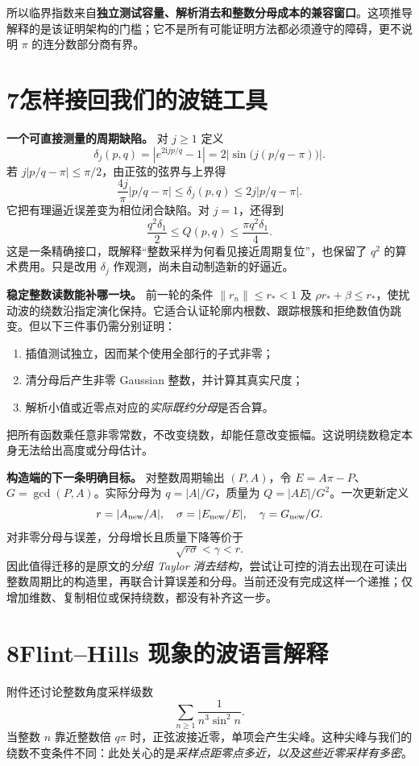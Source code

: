 \documentclass[11pt,a4paper]{article}
\newcommand{\ii}{\mathrm i}
\begin{document}
所以临界指数来自\textbf{独立测试容量、解析消去和整数分母成本的兼容窗口}。这项推导解释的是该证明架构的门槛；它不是所有可能证明方法都必须遵守的障碍，更不说明 $\pi$ 的连分数部分商有界。

\newpage
\section*{7\quad 怎样接回我们的波链工具}
\textbf{一个可直接测量的周期缺陷。} 对 $j\ge1$ 定义
\[
 \delta_j(p,q)=\left|e^{2\ii jp/q}-1\right|
 =2\left|\sin\bigl(j(p/q-\pi)\bigr)\right|.
\]
若 $j|p/q-\pi|\le\pi/2$，由正弦的弦界与上界得
\[
 \frac{4j}{\pi}|p/q-\pi|\le\delta_j(p,q)
 \le2j|p/q-\pi|.
\]
它把有理逼近误差变为相位闭合缺陷。对 $j=1$，还得到
\[
 \frac{q^2\delta_1}{2}\le Q(p,q)
 \le\frac{\pi q^2\delta_1}{4}.
\]
这是一条精确接口，既解释“整数采样为何看见接近周期复位”，也保留了 $q^2$ 的算术费用。只是改用 $\delta_j$ 作观测，尚未自动制造新的好逼近。

\textbf{稳定整数读数能补哪一块。} 前一轮的条件
$\|r_n\|\le r_*<1$ 及 $\rho r_*+\beta\le r_*$，使扰动波的绕数沿指定演化保持。它适合认证轮廓内根数、跟踪根簇和拒绝数值伪跳变。但以下三件事仍需分别证明：
\begin{enumerate}
\item 插值测试独立，因而某个使用全部行的子式非零；
\item 清分母后产生非零 Gaussian 整数，并计算其真实尺度；
\item 解析小值或近零点对应的\emph{实际既约分母}是否合算。
\end{enumerate}
把所有函数乘任意非零常数，不改变绕数，却能任意改变振幅。这说明绕数稳定本身无法给出高度或分母估计。

\textbf{构造端的下一条明确目标。} 对整数周期输出 $(P,A)$，令
$E=A\pi-P$、$G=\gcd(P,A)$。实际分母为 $q=|A|/G$，质量为 $Q=|AE|/G^2$。一次更新定义
\[
 r=|A_{\rm new}/A|,\quad\sigma=|E_{\rm new}/E|,
 \quad\gamma=G_{\rm new}/G.
\]
对非零分母与误差，分母增长且质量下降等价于
\[
 \sqrt{r\sigma}<\gamma<r.
\]
因此值得迁移的是原文的\emph{分组 Taylor 消去结构}，尝试让可控的消去出现在可读出整数周期比的构造里，再联合计算误差和分母。当前还没有完成这样一个递推；仅增加维数、复制相位或保持绕数，都没有补齐这一步。

\newpage
\section*{8\quad Flint--Hills 现象的波语言解释}
附件还讨论整数角度采样级数
\[
 \sum_{n\ge1}\frac{1}{n^3\sin^2 n}.
\]
当整数 $n$ 靠近整数倍 $q\pi$ 时，正弦波接近零，单项会产生尖峰。这种尖峰与我们的绕数不变条件不同：此处关心的是\emph{采样点距零点多近，以及这些近零采样有多密}。
\end{document}
